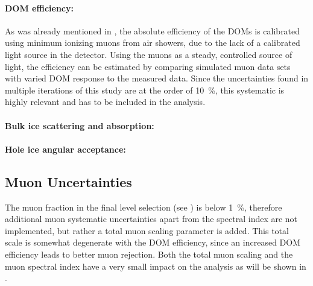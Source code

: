 \paragraph{DOM efficiency:}
As was already mentioned in , the absolute efficiency of the DOMs is calibrated using minimum ionizing muons from air showers, due to the lack of a calibrated light source in the detector. Using the muons as a steady, controlled source of light, the efficiency can be estimated by comparing simulated muon data sets with varied DOM response to the measured data. Since the uncertainties found in multiple iterations of this study  are at the order of \SI{10}{\percent}, this systematic is highly relevant and has to be included in the analysis.


\paragraph{Bulk ice scattering and absorption:}



\paragraph{Hole ice angular acceptance:}




\subsection{Muon Uncertainties}

The muon fraction in the final level selection (see ) is below \SI{1}{\percent}, therefore additional muon systematic uncertainties apart from the spectral index are not implemented, but rather a total muon scaling parameter is added. This total scale is somewhat degenerate with the DOM efficiency, since an increased DOM efficiency leads to better muon rejection. Both the total muon scaling and the muon spectral index have a very small impact on the analysis as will be shown in .
